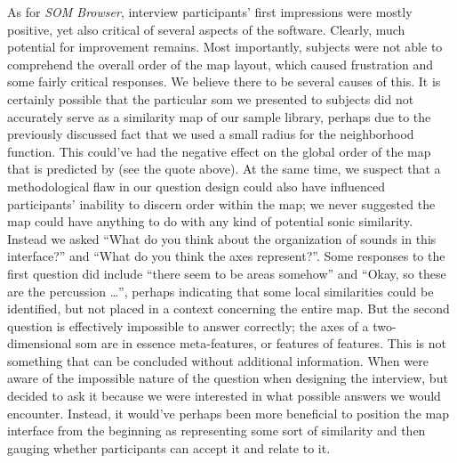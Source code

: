 As for \textit{SOM Browser}, interview participants' first impressions were
mostly positive, yet also critical of several aspects of the software. Clearly,
much potential for improvement remains. Most importantly, subjects were not
able to comprehend the overall order of the map layout, which caused
frustration and some fairly critical responses. We believe there to be several
causes of this. It is certainly possible that the particular \gls{som} we
presented to subjects did not accurately serve as a similarity map of our
sample library, perhaps due to the previously discussed fact that we used a
small radius for the neighborhood function. This could've had the negative
effect on the global order of the map that is predicted by \citet{kohonen1990}
(see the quote above). At the same time, we suspect that a methodological flaw
in our question design could also have influenced participants' inability to
discern order within the map; we never suggested the map could have anything to
do with any kind of potential sonic similarity. Instead we asked ``What do you
think about the organization of sounds in this interface?'' and
``What do you think the axes represent?''. Some responses to the first question
did include ``there seem to be areas somehow'' and ``Okay, so these are the
percussion \dots'', perhaps indicating that some local similarities could be
identified, but not placed in a context concerning the entire map. But the
second question is effectively impossible to answer correctly; the axes of a
two-dimensional \gls{som} are in essence meta-features, or features of features.
This is not something that can be concluded without additional information.
When were aware of the impossible nature of the question when designing the
interview, but decided to ask it because we were interested in what possible
answers we would encounter. Instead, it would've perhaps been more beneficial to
position the map interface from the beginning as representing some sort of
similarity and then gauging whether participants can accept it and relate to it.

\smallskip




